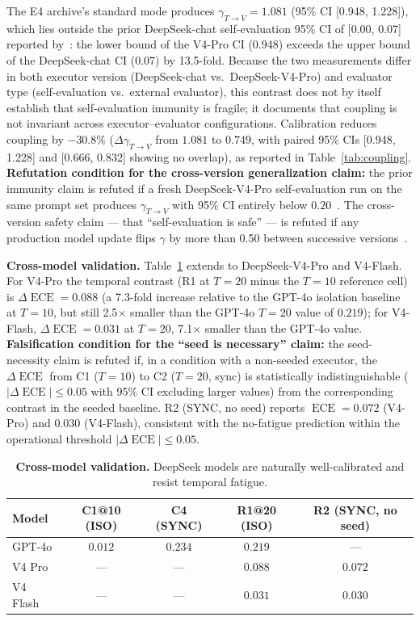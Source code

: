 \documentclass[11pt]{article}
\DeclareMathOperator{\ECE}{ECE}
\begin{document}
The E4 archive's standard mode produces $\gamma_{T \to V} = 1.081$ (95\% CI [0.948, 1.228]), which lies outside the prior DeepSeek-chat self-evaluation 95\% CI of [0.00, 0.07] reported by~\citet{epc2026}: the lower bound of the V4-Pro CI (0.948) exceeds the upper bound of the DeepSeek-chat CI (0.07) by 13.5-fold. Because the two measurements differ in both executor version (DeepSeek-chat vs.\ DeepSeek-V4-Pro) and evaluator type (self-evaluation vs.\ external evaluator), this contrast does not by itself establish that self-evaluation immunity is fragile; it documents that coupling is not invariant across executor--evaluator configurations. Calibration reduces coupling by $-30.8\%$ ($\Delta\gamma_{T\to V}$ from $1.081$ to $0.749$, with paired 95\% CIs [0.948, 1.228] and [0.666, 0.832] showing no overlap), as reported in Table~\ref{tab:coupling}. \textbf{Refutation condition for the cross-version generalization claim:} the prior immunity claim is refuted if a fresh DeepSeek-V4-Pro self-evaluation run on the same prompt set produces $\gamma_{T\to V}$ with 95\% CI entirely below $0.20$~\citep{epc2026,tian2023just}. The cross-version safety claim --- that ``self-evaluation is safe'' --- is refuted if any production model update flips $\gamma$ by more than 0.50 between successive versions~\citep{sclar2024quantifying}.

\textbf{Cross-model validation.} Table~\ref{tab:cross} extends to DeepSeek-V4-Pro and V4-Flash. For V4-Pro the temporal contrast (R1 at $T{=}20$ minus the $T{=}10$ reference cell) is $\Delta\ECE = 0.088$ (a 7.3-fold increase relative to the GPT-4o isolation baseline at $T{=}10$, but still 2.5$\times$ smaller than the GPT-4o $T{=}20$ value of $0.219$); for V4-Flash, $\Delta\ECE = 0.031$ at $T{=}20$, 7.1$\times$ smaller than the GPT-4o value. \textbf{Falsification condition for the ``seed is necessary'' claim:} the seed-necessity claim is refuted if, in a condition with a non-seeded executor, the $\Delta\ECE$ from C1 ($T{=}10$) to C2 ($T{=}20$, sync) is statistically indistinguishable ($|\Delta\ECE| \leq 0.05$ with 95\% CI excluding larger values) from the corresponding contrast in the seeded baseline. R2 (SYNC, no seed) reports $\ECE = 0.072$ (V4-Pro) and $0.030$ (V4-Flash), consistent with the no-fatigue prediction within the operational threshold $|\Delta\ECE| \leq 0.05$.

\begin{table}[H]
\centering
\caption{\textbf{Cross-model validation.} DeepSeek models are naturally well-calibrated and resist temporal fatigue.}
\label{tab:cross}
\begin{tabular}{@{}lcccc@{}}
\toprule
Model & C1@10 (ISO) & C4 (SYNC) & R1@20 (ISO) & R2 (SYNC, no seed) \\
\midrule
GPT-4o & $0.012$ & $0.234$ & $0.219$ & --- \\
V4 Pro & --- & --- & $0.088$ & $0.072$ \\
V4 Flash & --- & --- & $0.031$ & $0.030$ \\
\bottomrule
\end{tabular}
\end{table}
\end{document}
